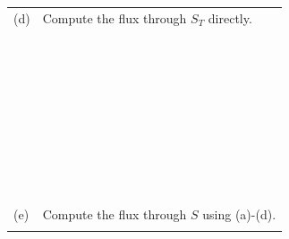 \documentclass[12pt]{amsart}
\numberwithin{equation}{section}
\begin{document}
{{\setlength{\extrarowheight}{0.1cm}
\begin{tabular}{p{0.35cm}p{14.6cm}}
	(d) & Compute the flux through $S_T$ directly. \\
	&\\&\\&\\&\\&\\&\\&\\&\\&\\&\\&\\&\\&\\&\\&\\&\\&\\&\\&\\&\\&\\&\\&\\&\\&\\&\\&\\&\\&\\&\\&\\&\\&\\&\\&\\&\\&\\
	(e) & Compute the flux through $S$ using (a)-(d). \\
	&\\
\end{tabular}}

\thispagestyle{empty}
\newpage
\thispagestyle{empty}

}
\end{document}
